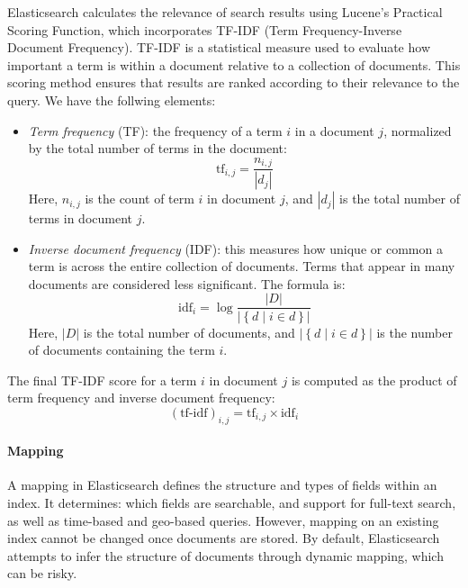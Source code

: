\begin{itemize}
        Elasticsearch calculates the relevance of search results using Lucene's Practical Scoring Function, which incorporates TF-IDF (Term Frequency-Inverse Document Frequency). 
        TF-IDF is a statistical measure used to evaluate how important a term is within a document relative to a collection of documents. 
        This scoring method ensures that results are ranked according to their relevance to the query.
        We have the follwing elements: 
        \begin{itemize}
            \item \textit{Term frequency} (TF): the frequency of a term $i$ in a document $j$, normalized by the total number of terms in the document:
                \[\text{tf}_{i,j}=\dfrac{n_{i,j}}{\left\lvert d_j\right\rvert }\]
                Here, $n_{i,j}$ is the count of term $i$ in document $j$, and $\left\lvert d_j\right\rvert$ is the total number of terms in document $j$.
            \item \textit{Inverse document frequency} (IDF): this measures how unique or common a term is across the entire collection of documents. 
                Terms that appear in many documents are considered less significant. 
                The formula is:
                \[\text{idf}_i=\log\dfrac{\left\lvert D\right\rvert}{\left\lvert \left\{d\mid i\in d\right\}\right\rvert }\]
                Here, $\left\lvert D\right\rvert$ is the total number of documents, and $\left\lvert \left\{d\mid i\in d\right\}\right\rvert$ is the number of documents containing the term $i$.
        \end{itemize}
        The final TF-IDF score for a term $i$ in document $j$ is computed as the product of term frequency and inverse document frequency:
        \[(\text{tf-idf})_{i,j}=\text{tf}_{i,j}\times \text{idf}_i\]
\end{itemize}

\paragraph*{Mapping}
A mapping in Elasticsearch defines the structure and types of fields within an index. 
It determines: which fields are searchable, and support for full-text search, as well as time-based and geo-based queries.
However, mapping on an existing index cannot be changed once documents are stored. 
By default, Elasticsearch attempts to infer the structure of documents through dynamic mapping, which can be risky.





